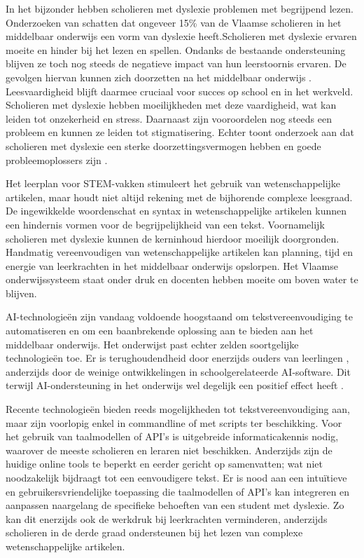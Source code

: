 In het bijzonder hebben scholieren met dyslexie problemen met begrijpend lezen. Onderzoeken van \textcite{Bonte2020, VanDerMeer2022} schatten dat ongeveer 15\% van de Vlaamse scholieren in het middelbaar onderwijs een vorm van dyslexie heeft.Scholieren met dyslexie ervaren moeite en hinder bij het lezen en spellen. Ondanks de bestaande ondersteuning blijven ze toch nog steeds de negatieve impact van hun leerstoornis ervaren. De gevolgen hiervan  kunnen zich doorzetten na het middelbaar onderwijs \autocite{Lissens2020}. Leesvaardigheid blijft daarmee cruciaal voor succes op school en in het werkveld. Scholieren met dyslexie hebben moeilijkheden met deze vaardigheid, wat kan leiden tot onzekerheid en stress. Daarnaast zijn vooroordelen nog steeds een probleem en kunnen ze leiden tot stigmatisering. Echter toont onderzoek aan dat scholieren met dyslexie een sterke doorzettingsvermogen hebben en goede probleemoplossers zijn \autocite{Ghesquiere2018, Lissens2020, Bonte2020}. 

\medspace

Het leerplan voor STEM-vakken stimuleert het gebruik van wetenschappelijke artikelen, maar houdt niet altijd rekening met de bijhorende complexe leesgraad. De ingewikkelde woordenschat en syntax in wetenschappelijke artikelen kunnen een hindernis vormen voor de begrijpelijkheid van een tekst. Voornamelijk scholieren met dyslexie kunnen de kerninhoud hierdoor moeilijk doorgronden. Handmatig vereenvoudigen van wetenschappelijke artikelen kan planning, tijd en energie van leerkrachten in het middelbaar onderwijs opslorpen. Het Vlaamse onderwijssysteem staat onder druk en docenten hebben moeite om boven water te blijven. 

\medspace

AI-technologieën zijn vandaag voldoende hoogstaand om tekstvereenvoudiging te automatiseren en om een baanbrekende oplossing aan te bieden aan het middelbaar onderwijs. Het onderwijst past echter zelden soortgelijke technologieën toe. Er is terughoudendheid door enerzijds ouders van leerlingen \autocite{Martens2021a}, anderzijds door de weinige ontwikkelingen in schoolgerelateerde AI-software. Dit terwijl AI-ondersteuning in het onderwijs wel degelijk een positief effect heeft \autocite{Belpaeme2018, Kraft2020}. 

\medspace

Recente technologieën bieden reeds mogelijkheden tot tekstvereenvoudiging aan, maar zijn voorlopig enkel in commandline of met scripts ter beschikking. Voor het gebruik van taalmodellen of API's is uitgebreide informaticakennis nodig, waarover de meeste scholieren en leraren niet beschikken. Anderzijds zijn de huidige online tools te beperkt en eerder gericht op samenvatten; wat niet noodzakelijk bijdraagt tot een eenvoudigere tekst. Er is nood aan een intuïtieve en gebruikersvriendelijke toepassing die taalmodellen of API's kan integreren en aanpassen naargelang de specifieke behoeften van een student met dyslexie. Zo kan dit enerzijds ook de werkdruk bij leerkrachten verminderen, anderzijds scholieren in de derde graad ondersteunen bij het lezen van complexe wetenschappelijke artikelen. 


